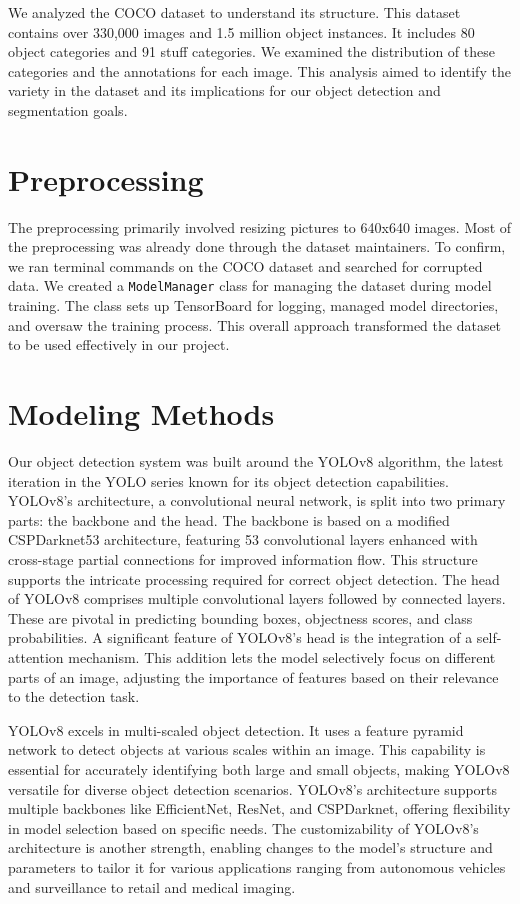 \documentclass[10pt]{extarticle}
\begin{document}
We analyzed the COCO dataset to understand its structure. This dataset contains over 330,000 images and 1.5 million object instances. It includes 80 object categories and 91 stuff categories. We examined the distribution of these categories and the annotations for each image. This analysis aimed to identify the variety in the dataset and its implications for our object detection and segmentation goals.

\section{Preprocessing}

The preprocessing primarily involved resizing pictures to 640x640 images. Most of the preprocessing was already done through the dataset maintainers. To confirm, we ran terminal commands on the COCO dataset and searched for corrupted data. We created a \texttt{ModelManager} class for managing the dataset during model training. The class sets up TensorBoard for logging, managed model directories, and oversaw the training process. This overall approach transformed the dataset to be used effectively in our project.

\section{Modeling Methods}

Our object detection system was built around the YOLOv8 algorithm, the latest iteration in the YOLO series known for its object detection capabilities. YOLOv8's architecture, a convolutional neural network, is split into two primary parts: the backbone and the head. The backbone is based on a modified CSPDarknet53 architecture, featuring 53 convolutional layers enhanced with cross-stage partial connections for improved information flow. This structure supports the intricate processing required for correct object detection. The head of YOLOv8 comprises multiple convolutional layers followed by connected layers. These are pivotal in predicting bounding boxes, objectness scores, and class probabilities. A significant feature of YOLOv8's head is the integration of a self-attention mechanism. This addition lets the model selectively focus on different parts of an image, adjusting the importance of features based on their relevance to the detection task.

YOLOv8 excels in multi-scaled object detection. It uses a feature pyramid network to detect objects at various scales within an image. This capability is essential for accurately identifying both large and small objects, making YOLOv8 versatile for diverse object detection scenarios. YOLOv8's architecture supports multiple backbones like EfficientNet, ResNet, and CSPDarknet, offering flexibility in model selection based on specific needs. The customizability of YOLOv8's architecture is another strength, enabling changes to the model's structure and parameters to tailor it for various applications ranging from autonomous vehicles and surveillance to retail and medical imaging.
\end{document}

